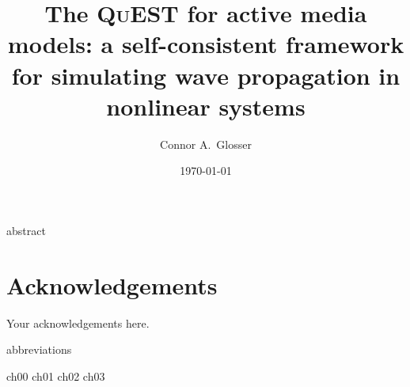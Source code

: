 \documentclass[mixedtoc]{msu-thesis-custom}
\title{The \textsc{QuEST} for active media models: a self-consistent framework for simulating wave propagation in nonlinear systems}
\author{Connor A.\ Glosser}
\date{\today}
\begin{document}
\frontmatter
\maketitlepage

{abstract}

\clearpage

\makecopyrightpage

%
%
\clearpage
\chapter*{Acknowledgements}
\DoubleSpacing %
Your acknowledgements here.
%
\clearpage
\SingleSpacing
\tableofcontents* %
\clearpage
\listoftables %
\clearpage
\listoffigures %

%
\makenomenclature
{abbreviations}

\mainmatter
%

{ch00}
{ch01}
{ch02}
{ch03}
\end{document}
